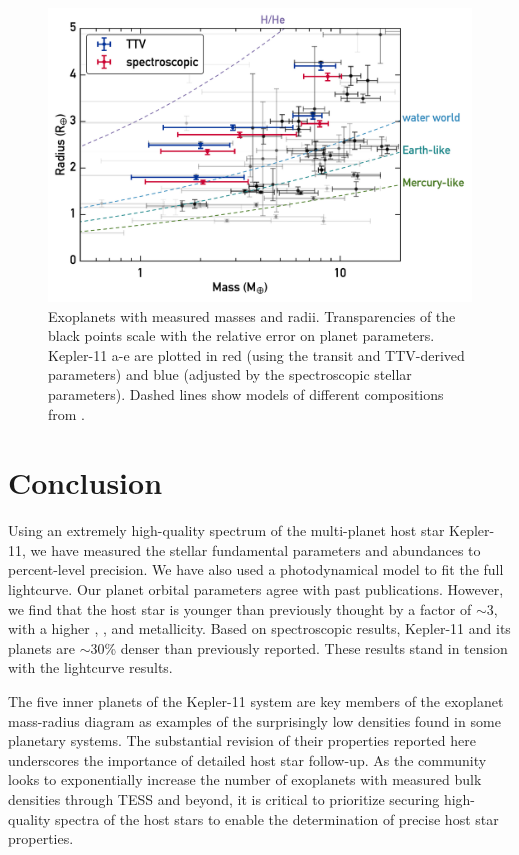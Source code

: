 \documentclass[oneside]{emulateapj}
\begin{document}
\begin{figure}
\centering
\includegraphics[scale=0.6]{K11_massradius}
\caption{Exoplanets with measured masses and radii. Transparencies of the black points scale with the relative error on planet parameters. Kepler-11 a-e are plotted in red (using the transit and TTV-derived parameters) and blue (adjusted by the spectroscopic stellar parameters). Dashed lines show models of different compositions from \citet{Seager2007}.}
\label{fig:mr}
\end{figure}


\section{Conclusion}

Using an extremely high-quality spectrum of the multi-planet host star Kepler-11, we have measured the stellar fundamental parameters and abundances to percent-level precision. We have also used a photodynamical model to fit the full \Kepler lightcurve. Our planet orbital parameters agree with past publications. However, we find that the host star is younger than previously thought by a factor of $\sim$3, with a higher \teff, \logg, and metallicity. Based on spectroscopic results, Kepler-11 and its planets are $\sim$30\% denser than previously reported. These results stand in tension with the lightcurve results.

The five inner planets of the Kepler-11 system are key members of the exoplanet mass-radius diagram as examples of the surprisingly low densities found in some planetary systems. The substantial revision of their properties reported here underscores the importance of detailed host star follow-up. As the community looks to exponentially increase the number of exoplanets with measured bulk densities through TESS and beyond, it is critical to prioritize securing high-quality spectra of the host stars to enable the determination of precise host star properties.
\end{document}

